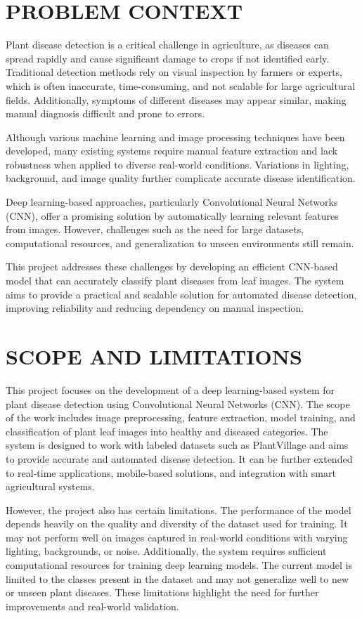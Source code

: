 \documentclass[12pt]{report}
\begin{document}
\section{PROBLEM CONTEXT}
Plant disease detection is a critical challenge in agriculture, as diseases can spread rapidly and cause significant damage to crops if not identified early. Traditional detection methods rely on visual inspection by farmers or experts, which is often inaccurate, time-consuming, and not scalable for large agricultural fields. Additionally, symptoms of different diseases may appear similar, making manual diagnosis difficult and prone to errors.

Although various machine learning and image processing techniques have been developed, many existing systems require manual feature extraction and lack robustness when applied to diverse real-world conditions. Variations in lighting, background, and image quality further complicate accurate disease identification.

Deep learning-based approaches, particularly Convolutional Neural Networks (CNN), offer a promising solution by automatically learning relevant features from images. However, challenges such as the need for large datasets, computational resources, and generalization to unseen environments still remain.

This project addresses these challenges by developing an efficient CNN-based model that can accurately classify plant diseases from leaf images. The system aims to provide a practical and scalable solution for automated disease detection, improving reliability and reducing dependency on manual inspection.

\section{SCOPE AND LIMITATIONS}
This project focuses on the development of a deep learning-based system for plant disease detection using Convolutional Neural Networks (CNN). The scope of the work includes image preprocessing, feature extraction, model training, and classification of plant leaf images into healthy and diseased categories. The system is designed to work with labeled datasets such as PlantVillage and aims to provide accurate and automated disease detection. It can be further extended to real-time applications, mobile-based solutions, and integration with smart agricultural systems.

However, the project also has certain limitations. The performance of the model depends heavily on the quality and diversity of the dataset used for training. It may not perform well on images captured in real-world conditions with varying lighting, backgrounds, or noise. Additionally, the system requires sufficient computational resources for training deep learning models. The current model is limited to the classes present in the dataset and may not generalize well to new or unseen plant diseases. These limitations highlight the need for further improvements and real-world validation.
\end{document}
